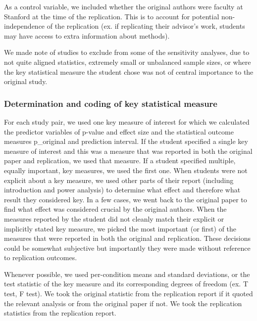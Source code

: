 \documentclass[
  english,
  a4paper,
]{article}
\begin{document}
As a control variable, we included whether the original authors were faculty at Stanford at the time of the replication. This is to account for potential non-independence of the replication (ex. if replicating their advisor's work, students may have access to extra information about methods).

We made note of studies to exclude from some of the sensitivity analyses, due to not quite aligned statistics, extremely small or unbalanced sample sizes, or where the key statistical measure the student chose was not of central importance to the original study.

\hypertarget{determination-and-coding-of-key-statistical-measure}{%
\subsubsection{Determination and coding of key statistical measure}\label{determination-and-coding-of-key-statistical-measure}}

For each study pair, we used one key measure of interest for which we calculated the predictor variables of p-value and effect size and the statistical outcome measures p\_original and prediction interval.
If the student specified a single key measure of interest and this was a measure that was reported in both the original paper and replication, we used that measure. If a student specified multiple, equally important, key measures, we used the first one. When students were not explicit about a key measure, we used other parts of their report (including introduction and power analysis) to determine what effect and therefore what result they considered key. In a few cases, we went back to the original paper to find what effect was considered crucial by the original authors. When the measures reported by the student did not cleanly match their explicit or implicitly stated key measure, we picked the most important (or first) of the measures that were reported in both the original and replication. These decisions could be somewhat subjective but importantly they were made without reference to replication outcomes.

Whenever possible, we used per-condition means and standard deviations, or the test statistic of the key measure and its corresponding degrees of freedom (ex. T test, F test). We took the original statistic from the replication report if it quoted the relevant analysis or from the original paper if not. We took the replication statistics from the replication report.
\end{document}
